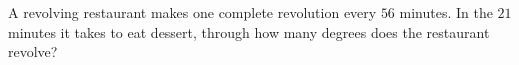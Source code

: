 A revolving restaurant makes one complete revolution every $56$ minutes. In the $21$ minutes it takes to eat dessert, through how many degrees does the restaurant revolve?
